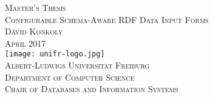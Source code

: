 \begin{titlepage}
\begin{center}
	\vspace{6em}
	{\Large \textsc{Master's Thesis}}\\
	\vspace{5em}
	{\huge \textsc{Configurable Schema-Aware RDF Data Input Forms}}\\
	\vspace{4em}
	{\Large \textsc{Dávid Konkoly}}\\
	\vspace{3em}
	{\Large \textsc{April 2017}}\\
	\vspace{4em}
	\texttt{[image: unifr-logo.jpg]}\\
	\vspace{4em}
	{\Large \textsc{Albert-Ludwigs Universität Freiburg}}\\
	\vspace{1em}
	{\Large \textsc{Department of Computer Science}}\\
	\vspace{1em}
	{\Large \textsc{Chair of Databases and Information Systems}}\\
\end{center}
\end{titlepage}